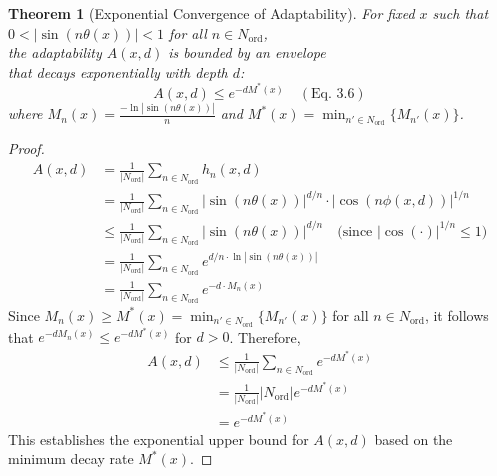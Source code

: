 \documentclass[11pt,a4paper]{article}
\newtheorem{theorem}{Theorem}[section]
\begin{document}
\begin{theorem}[Exponential Convergence of Adaptability]
For fixed $x$ such that $0 < |\sin(n\theta(x))|<1$ for all $n \in N_{\text{ord}}$, \\
the adaptability $A(x,d)$ is bounded by an envelope \\
that decays exponentially with depth $d$:
\begin{equation}
    A(x,d) \leq e^{-d M^*(x)} \quad (\text{Eq. 3.6})
\end{equation}
where $M_n(x) = \frac{-\ln|\sin(n\theta(x))|}{n}$ and $M^*(x) = \min_{n' \in N_{\text{ord}}} \{M_{n'}(x)\}$.
\end{theorem}

\begin{proof}
\begin{align}
A(x,d) &= \frac{1}{|N_{\text{ord}}|} \sum_{n \in N_{\text{ord}}} h_n(x,d) \\
&= \frac{1}{|N_{\text{ord}}|} \sum_{n \in N_{\text{ord}}} |\sin(n\theta(x))|^{d/n} \cdot |\cos(n\phi(x,d))|^{1/n} \\
&\leq \frac{1}{|N_{\text{ord}}|} \sum_{n \in N_{\text{ord}}} |\sin(n\theta(x))|^{d/n} \quad \text{(since $|\cos(\cdot)|^{1/n} \leq 1$)} \\
&= \frac{1}{|N_{\text{ord}}|} \sum_{n \in N_{\text{ord}}} e^{d/n \cdot \ln|\sin(n\theta(x))|} \\
&= \frac{1}{|N_{\text{ord}}|} \sum_{n \in N_{\text{ord}}} e^{-d \cdot M_n(x)}
\end{align}
Since $M_n(x) \geq M^*(x) = \min_{n' \in N_{\text{ord}}} \{M_{n'}(x)\}$ for all $n \in N_{\text{ord}}$, it follows that $e^{-d M_n(x)} \leq e^{-d M^*(x)}$ for $d > 0$.
Therefore,
\begin{align}
A(x,d) &\leq \frac{1}{|N_{\text{ord}}|} \sum_{n \in N_{\text{ord}}} e^{-d M^*(x)} \\
&= \frac{1}{|N_{\text{ord}}|} |N_{\text{ord}}| e^{-d M^*(x)} \\
&= e^{-d M^*(x)}
\end{align}
This establishes the exponential upper bound for $A(x,d)$ based on the minimum decay rate $M^*(x)$.
\end{proof}
\end{document}
